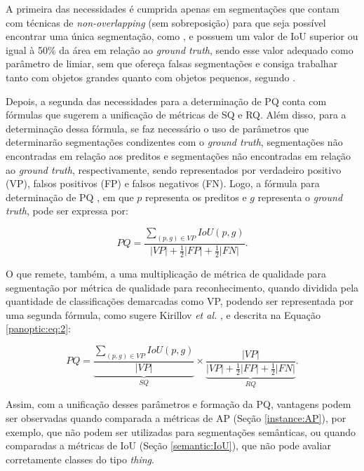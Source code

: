 A primeira das necessidades é cumprida apenas em segmentações que contam com técnicas de \textit{non-overlapping} (sem sobreposição) para que seja possível encontrar uma única segmentação, como \cite{Neubeck2006}, e possuem um valor de IoU superior ou igual à 50\% da área em relação ao \textit{ground truth}, sendo esse valor adequado como parâmetro de limiar, sem que ofereça falsas segmentações e consiga trabalhar tanto com objetos grandes quanto com objetos pequenos, segundo \cite{Kirillov2019a}.

Depois, a segunda das necessidades para a determinação de PQ conta com fórmulas que sugerem a unificação de métricas de SQ e RQ. Além disso, para a determinação dessa fórmula, se faz necessário o uso de parâmetros que determinarão segmentações condizentes com o \textit{ground truth}, segmentações não encontradas em relação aos preditos e segmentações não encontradas em relação ao \textit{ground truth}, respectivamente, sendo representados por verdadeiro positivo (VP), falsos positivos (FP) e falsos negativos (FN). Logo, a fórmula para determinação de PQ \cite{Kirillov2019a}, em que $p$ representa os preditos e $g$ representa o \textit{ground truth}, pode ser expressa por:

\begin{equation}
\label{panoptic:eq:1}
    PQ = \frac{\sum _{(p,g) \in VP} IoU(p,g)}{|VP|+ \frac{1}{2}|FP| + \frac{1}{2}|FN|}.
\end{equation}

O que remete, também, a uma multiplicação de métrica de qualidade para segmentação por métrica de qualidade para reconhecimento, quando dividida pela quantidade de classificações demarcadas como VP, podendo ser representada por uma segunda fórmula, como sugere Kirillov \textit{et al.} \cite{Kirillov2019a}, e descrita na Equação \ref{panoptic:eq:2}:

\begin{equation}
\label{panoptic:eq:2}
   PQ = \underbrace{\frac{\sum _{(p,g) \in VP} IoU(p,g)}{|VP|}}_{SQ} \times \underbrace{\frac{|VP|}{|VP|+ \frac{1}{2}|FP| + \frac{1}{2}|FN|}}_{RQ}.
\end{equation}

Assim, com a unificação desses parâmetros e formação da PQ, vantagens podem ser observadas quando comparada a métricas de AP (Seção \ref{instance:AP}), por exemplo, que não podem ser utilizadas para segmentações semânticas, ou quando comparadas a métricas de IoU (Seção \ref{semantic:IoU}), que não pode avaliar corretamente classes do tipo \textit{thing}.


